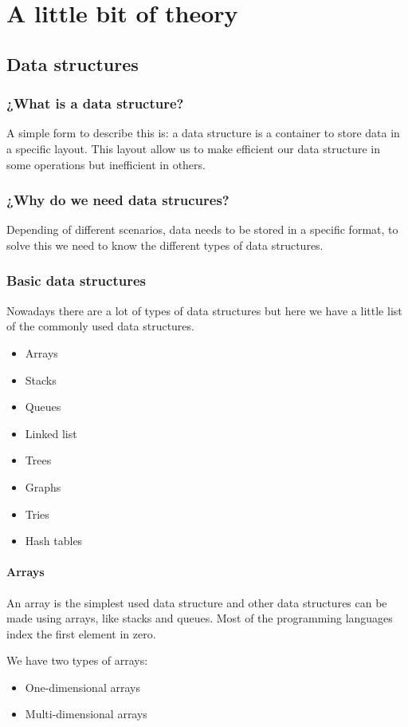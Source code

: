\chapter{A little bit of theory}
\section{Data structures}
\subsection{¿What is a data structure?}
A simple form to describe this is: a data structure is a container to store data in a specific layout.
This layout allow us to make efficient our data structure in some operations but inefficient in others.

\subsection{¿Why do we need data strucures?}
Depending of different scenarios, data needs to be stored in a specific format, to solve this we need to know the different types of data structures.

\subsection{Basic data structures}
Nowadays there are a lot of types of data structures but here we have a little list of the commonly used data structures.
\begin{itemize}
    \item { Arrays }
    \item { Stacks }
    \item { Queues }
    \item { Linked list }
    \item { Trees }
    \item { Graphs }
    \item { Tries }
    \item { Hash tables }
\end{itemize}

\subsubsection{Arrays}
An array is the simplest used data structure and other data structures can be made using arrays, like stacks and queues. Most of the programming languages index the first element in zero.

We have two types of arrays:
\begin{itemize}
    \item { One-dimensional arrays }
    \item { Multi-dimensional arrays}
\end{itemize}   

